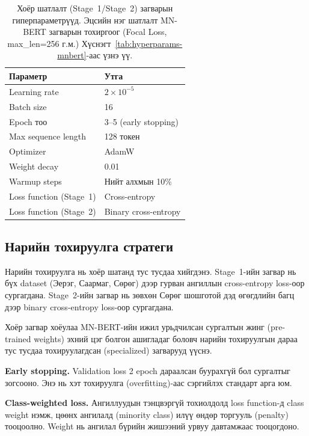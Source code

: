 \begin{table}[H]
\centering
\caption{Хоёр шатлалт (Stage~1/Stage~2) загварын гиперпараметрүүд. Эцсийн нэг
  шатлалт MN-BERT загварын тохиргоог (Focal Loss, max\_len=256 г.м.)
  Хүснэгт~\ref{tab:hyperparams-mnbert}-аас үзнэ үү.}
\label{tab:hyperparams}
\begin{tabular}{@{}ll@{}}
\toprule
\textbf{Параметр} & \textbf{Утга} \\
\midrule
Learning rate             & $2 \times 10^{-5}$ \\
Batch size                & 16 \\
Epoch тоо                 & 3--5 (early stopping) \\
Max sequence length       & 128 токен \\
Optimizer                 & AdamW \\
Weight decay              & 0.01 \\
Warmup steps              & Нийт алхмын 10\% \\
Loss function (Stage~1)   & Cross-entropy \\
Loss function (Stage~2)   & Binary cross-entropy \\
\bottomrule
\end{tabular}
\end{table}

\subsection{Нарийн тохируулга стратеги}

Нарийн тохируулга нь хоёр шатанд тус тусдаа хийгдэнэ. Stage~1-ийн загвар нь бүх
dataset (Эерэг, Саармаг, Сөрөг) дээр гурван ангиллын cross-entropy
loss-оор сургагдана. Stage~2-ийн загвар нь зөвхөн Сөрөг шошготой
дэд өгөгдлийн багц дээр binary cross-entropy loss-оор сургагдана.

Хоёр загвар хоёулаа MN-BERT-ийн ижил урьдчилсан сургалтын жинг (pre-trained
weights) эхний цэг болгон ашигладаг боловч нарийн тохируулгын дараа тус тусдаа
тохируулагдсан (specialized) загварууд үүснэ.

\textbf{Early stopping.} Validation loss 2 epoch дараалсан буурахгүй бол
сургалтыг зогсооно. Энэ нь хэт тохируулга (overfitting)-аас сэргийлэх
стандарт арга юм.

\textbf{Class-weighted loss.} Ангиллуудын тэнцвэргүй тохиолдолд loss
function-д class weight нэмж, цөөнх ангилалд (minority class) илүү өндөр
торгууль (penalty) тооцоолно. Weight нь ангилал бүрийн жишээний
урвуу давтамжаас тооцогдоно.

